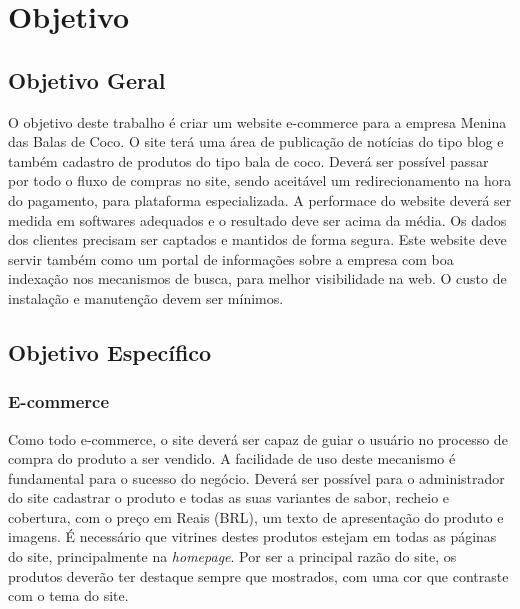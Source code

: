 \chapter{Objetivo}

\section{Objetivo Geral}

O objetivo deste trabalho é criar um website e-commerce para a empresa Menina das Balas de Coco. O site terá uma área de publicação de notícias do tipo blog e também cadastro de produtos do tipo bala de coco. Deverá ser possível passar por todo o fluxo de compras no site, sendo aceitável um redirecionamento na hora do pagamento, para plataforma especializada. A performace do website deverá ser medida em softwares adequados e o resultado deve ser acima da média. Os dados dos clientes precisam ser captados e mantidos de forma segura. Este website deve servir também como um portal de informações sobre a empresa com boa indexação nos mecanismos de busca, para melhor visibilidade na web. O custo de instalação e manutenção devem ser mínimos.

\section{Objetivo Específico}

\subsection{E-commerce}

Como todo e-commerce, o site deverá ser capaz de guiar o usuário no processo de compra do produto a ser vendido. A facilidade de uso deste mecanismo é fundamental para o sucesso do negócio. Deverá ser possível para o administrador do site cadastrar o produto e todas as suas variantes de sabor, recheio e cobertura, com o preço em Reais (BRL), um texto de apresentação do produto e imagens. É necessário que vitrines destes produtos estejam em todas as páginas do site, principalmente na \textit{homepage}. Por ser a principal razão do site, os produtos deverão ter destaque sempre que mostrados, com uma cor que contraste com o tema do site.

